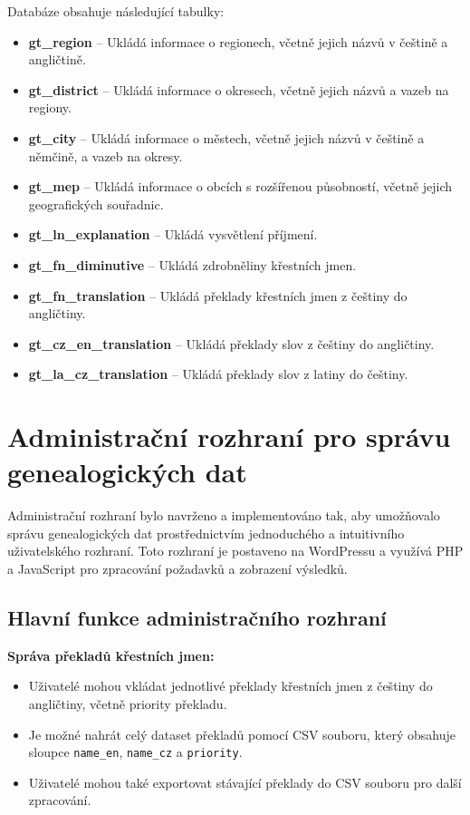 \documentclass[czech, ba, kiv, he]{fasthesis}
\begin{document}
Databáze obsahuje následující tabulky:

\begin{itemize}
    \item \textbf{gt\_region} – Ukládá informace o regionech, včetně jejich názvů v češtině a angličtině.
    \item \textbf{gt\_district} – Ukládá informace o okresech, včetně jejich názvů a vazeb na regiony.
    \item \textbf{gt\_city} – Ukládá informace o městech, včetně jejich názvů v češtině a němčině, a vazeb na okresy.
    \item \textbf{gt\_mep} – Ukládá informace o obcích s rozšířenou působností, včetně jejich geografických souřadnic.
    \item \textbf{gt\_ln\_explanation} – Ukládá vysvětlení příjmení.
    \item \textbf{gt\_fn\_diminutive} – Ukládá zdrobněliny křestních jmen.
    \item \textbf{gt\_fn\_translation} – Ukládá překlady křestních jmen z češtiny do angličtiny.
    \item \textbf{gt\_cz\_en\_translation} – Ukládá překlady slov z češtiny do angličtiny.
    \item \textbf{gt\_la\_cz\_translation} – Ukládá překlady slov z latiny do češtiny.
\end{itemize}

\section{Administrační rozhraní pro správu genealogických dat}

Administrační rozhraní bylo navrženo a implementováno tak, aby umožňovalo správu genealogických dat prostřednictvím jednoduchého a intuitivního uživatelského rozhraní. Toto rozhraní je postaveno na WordPressu a využívá PHP a JavaScript pro zpracování požadavků a zobrazení výsledků.

\subsection{Hlavní funkce administračního rozhraní}

\textbf{Správa překladů křestních jmen:}
\begin{itemize}
    \item Uživatelé mohou vkládat jednotlivé překlady křestních jmen z češtiny do angličtiny, včetně priority překladu.
    \item Je možné nahrát celý dataset překladů pomocí CSV souboru, který obsahuje sloupce \texttt{name\_en}, \texttt{name\_cz} a \texttt{priority}.
    \item Uživatelé mohou také exportovat stávající překlady do CSV souboru pro další zpracování.
\end{itemize}
\end{document}
